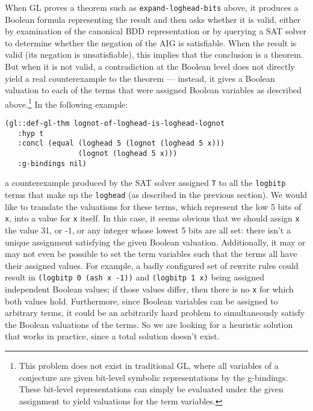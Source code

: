 \documentclass[submission,copyright,creativecommons]{eptcs}
\begin{document}
When GL proves a theorem such as \texttt{expand-loghead-bits} above,
it produces a Boolean formula representing the result and then asks
whether it is valid, either by examination of the canonical BDD
representation or by querying a SAT solver to determine whether the
negation of the AIG is satisfiable.  When the result is valid (its
negation is unsatisfiable), this implies that the conclusion is a
theorem.  But when it is not valid, a contradiction at the Boolean
level does not directly yield a real counterexample to the theorem ---
instead, it gives a Boolean valuation to each of the terms that were
assigned Boolean variables as described above.\footnote{This problem
  does not exist in traditional GL, where all variables of a
  conjecture are given bit-level symbolic representations by the
  g-bindings.  These bit-level representations can simply be evaluated
  under the given assignment to yield valuations for the term
  variables.}  In the following example:
\begin{verbatim}
(gl::def-gl-thm lognot-of-loghead-is-loghead-lognot
   :hyp t
   :concl (equal (loghead 5 (lognot (loghead 5 x)))
                 (lognot (loghead 5 x)))
   :g-bindings nil)
\end{verbatim}
a counterexample produced by the SAT solver assigned \texttt{T} to all
the \texttt{logbitp} terms that make up the \texttt{loghead} (as
described in the previous section).  We would like to translate the
valuations for these terms, which represent the low 5 bits of
\texttt{x}, into a value for \texttt{x} itself.  In this case, it
seems obvious that we should assign \texttt{x} the value 31, or -1, or
any integer whose lowest 5 bits are all set: there isn't a unique
assignment satisfying the given Boolean valuation.  Additionally, it
may or may not even be possible to set the term variables such that
the terms all have their assigned values.  For example, a badly
configured set of rewrite rules could result in \texttt{(logbitp 0 (ash x
  -1))} and \texttt{(logbitp 1 x)} being assigned independent Boolean values;
if those values differ, then there is no \texttt{x} for which both
values hold.  Furthermore, since Boolean variables can be assigned to
arbitrary terms, it could be an arbitrarily hard problem to
simultaneously satisfy the Boolean valuations of the terms.  So we are
looking for a heuristic solution that works in practice, since a total
solution doesn't exist.
\end{document}
